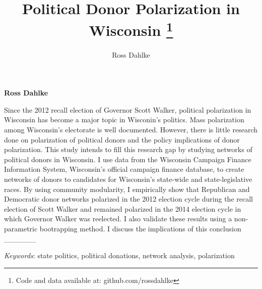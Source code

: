 \documentclass[11pt,]{article}
\title{Political Donor Polarization in Wisconsin \thanks{Code and data available at: github.com/rossdahlke}  }
\author{\Large Ross Dahlke\vspace{0.05in} \newline\normalsize\emph{}  }
\date{}
\newcommand*{\authorfont}{\fontfamily{phv}\selectfont}
\renewenvironment{abstract}
 {{%
    \setlength{\leftmargin}{0mm}
    \setlength{\rightmargin}{\leftmargin}%
  }%
  \relax}
 {\endlist}
\begin{document}
	
%

{%
\setlength{\parindent}{0pt}
\thispagestyle{plain}
{\fontsize{18}{20}\selectfont\raggedright 
\maketitle  %

}

{
   \vskip 13.5pt\relax \normalsize\fontsize{11}{12} 
\textbf{\authorfont Ross Dahlke} \hskip 15pt \emph{\small }   

}

}








\begin{abstract}

    \hbox{\vrule height .2pt width 39.14pc}

    \vskip 8.5pt %

\noindent Since the 2012 recall election of Governor Scott Walker, political
polarization in Wisconsin has become a major topic in Wisconin's
politics. Mass polarization among Wisconsin's electorate is well
documented. However, there is little research done on polarization of
political donors and the policy implications of donor polarization. This
study intends to fill this research gap by studying networks of
political donors in Wisconsin. I use data from the Wisconsin Campaign
Finance Information System, Wisconsin's official campaign finance
database, to create networks of donors to candidates for Wisconsin's
state-wide and state-legislative races. By using community modularity, I
empirically show that Republican and Democratic donor networks polarized
in the 2012 election cycle during the recall election of Scott Walker
and remained polarized in the 2014 election cycle in which Governor
Walker was reelected. I also validate these results using a
non-parametric bootrapping method. I discuss the implications of this
conclusion \_\_\_\_\_\_


\vskip 8.5pt \noindent \emph{Keywords}: state politics, political donations, network analysis, polarization \par

    \hbox{\vrule height .2pt width 39.14pc}



\end{abstract}
\end{document}

